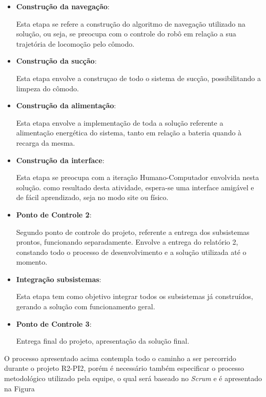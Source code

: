 \begin{itemize}
		\item \textbf{Construção da navegação}:

			Esta etapa se refere a construção do algoritmo de navegação utilizado na solução, ou seja, se preocupa com o controle do robô em relação a sua trajetória de locomoção pelo cômodo.

		\item \textbf{Construção da sucção}:

			Esta etapa envolve a construçao de todo o sistema de sucção, possibilitando a limpeza do cômodo.

		\item \textbf{Construção da alimentação}:

			Esta etapa envolve a implementação de toda a solução referente a alimentação energética do sistema, tanto em relação a bateria quando à recarga da mesma.

		\item \textbf{Construção da interface}:

			Esta etapa se preocupa com a iteração Humano-Computador envolvida nesta solução. como resultado desta atividade, espera-se uma interface amigável e de fácil aprendizado, seja no modo site ou físico.

		\item \textbf{Ponto de Controle 2}:

			Segundo ponto de controle do projeto, referente a entrega dos subsistemas prontos, funcionando separadamente. Envolve a entrega do relatório 2, constando todo o processo de desenvolvimento e a solução utilizada até o momento.

		\item \textbf{Integração subsistemas}:

			Esta etapa tem como objetivo integrar todos os subsistemas já construídos, gerando a solução com funcionamento geral.

		\item \textbf{Ponto de Controle 3}:

			Entrega final do projeto, apresentação da solução final.
	\end{itemize}

	O processo apresentado acima contempla todo o caminho a ser percorrido durante o projeto R2-PI2, porém é necessário também especificar o processo metodológico utilizado pela equipe, o qual será baseado no \textit{Scrum} e é apresentado na Figura 



